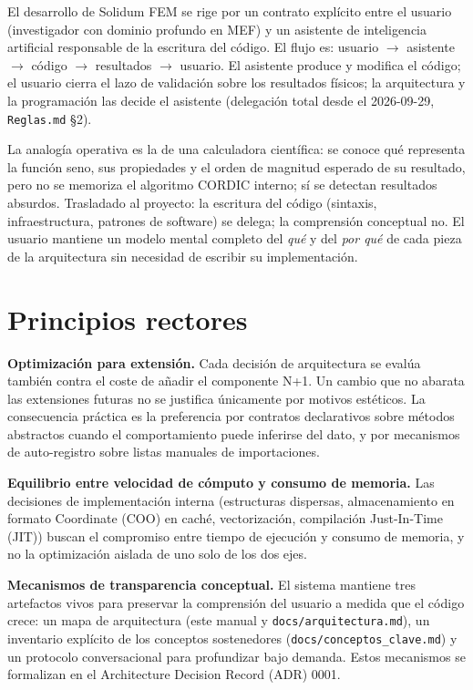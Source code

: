 \documentclass[11pt,oneside]{report}
\begin{document}
El desarrollo de Solidum FEM se rige por un contrato explícito entre el usuario (investigador con dominio profundo en MEF) y un asistente de inteligencia artificial responsable de la escritura del código. El flujo es: usuario \ensuremath{\to} asistente \ensuremath{\to} código \ensuremath{\to} resultados \ensuremath{\to} usuario. El asistente produce y modifica el código; el usuario cierra el lazo de validación sobre los resultados físicos; la arquitectura y la programación las decide el asistente (delegación total desde el 2026-09-29, \texttt{Reglas.md} §2).

La analogía operativa es la de una calculadora científica: se conoce qué representa la función seno, sus propiedades y el orden de magnitud esperado de su resultado, pero no se memoriza el algoritmo CORDIC interno; sí se detectan resultados absurdos. Trasladado al proyecto: la escritura del código (sintaxis, infraestructura, patrones de software) se delega; la comprensión conceptual no. El usuario mantiene un modelo mental completo del \textit{qué} y del \textit{por qué} de cada pieza de la arquitectura sin necesidad de escribir su implementación.

\section{Principios rectores}

\textbf{Optimización para extensión.} Cada decisión de arquitectura se evalúa también contra el coste de añadir el componente N+1. Un cambio que no abarata las extensiones futuras no se justifica únicamente por motivos estéticos. La consecuencia práctica es la preferencia por contratos declarativos sobre métodos abstractos cuando el comportamiento puede inferirse del dato, y por mecanismos de auto-registro sobre listas manuales de importaciones.

\textbf{Equilibrio entre velocidad de cómputo y consumo de memoria.} Las decisiones de implementación interna (estructuras dispersas, almacenamiento en formato Coordinate (COO) en caché, vectorización, compilación Just-In-Time (JIT)) buscan el compromiso entre tiempo de ejecución y consumo de memoria, y no la optimización aislada de uno solo de los dos ejes.

\textbf{Mecanismos de transparencia conceptual.} El sistema mantiene tres artefactos vivos para preservar la comprensión del usuario a medida que el código crece: un mapa de arquitectura (este manual y \texttt{docs/\allowbreak{}arquitectura.\allowbreak{}md}), un inventario explícito de los conceptos sostenedores (\texttt{docs/\allowbreak{}conceptos\_\allowbreak{}clave.\allowbreak{}md}) y un protocolo conversacional para profundizar bajo demanda. Estos mecanismos se formalizan en el Architecture Decision Record (ADR) 0001.
\end{document}
